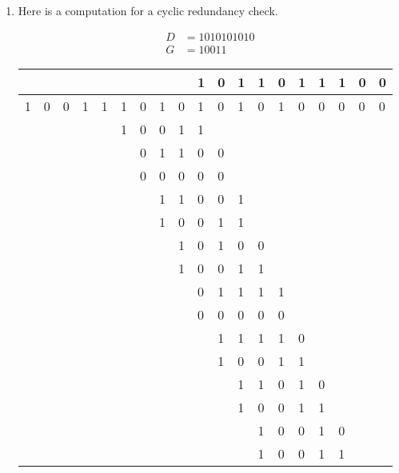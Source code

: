 \documentclass[twoside]{article}
\newenvironment{answer}
  {\vspace*{0.2cm} \rule{12cm}{0.04cm} \vspace*{0.2cm}}
  {\vspace*{0.2cm}}
\begin{document}
\begin{enumerate}
\begin{answer}
    \end{answer}

  \item Here is a computation for a cyclic redundancy check.

  \begin{align*}
    D & = 1010101010 \\
    G & = 10011
    \end{align*}

  \begin{tabular}{lllll|llllllllllllll}
      &   &   &   &   &   &   &   &   & 1 & 0 & 1 & 1 & 0 & 1 & 1 & 1 & 0 & 0    \\ \hline
    1 & 0 & 0 & 1 & 1 & 1 & 0 & 1 & 0 & 1 & 0 & 1 & 0 & 1 & 0 & 0 & 0 & 0 & 0  \\ 
      &   &   &   &   & 1 & 0 & 0 & 1 & 1 &   &   &   &   &   &   &   &   &    \\ \hline
      &   &   &   &   &   & 0 & 1 & 1 & 0 & 0 &   &   &   &   &   &   &   &    \\ 
      &   &   &   &   &   & 0 & 0 & 0 & 0 & 0 &   &   &   &   &   &   &   &    \\ \hline
      &   &   &   &   &   &   & 1 & 1 & 0 & 0 & 1 &   &   &   &   &   &   &    \\ 
      &   &   &   &   &   &   & 1 & 0 & 0 & 1 & 1 &   &   &   &   &   &   &    \\ \hline
      &   &   &   &   &   &   &   & 1 & 0 & 1 & 0 & 0 &   &   &   &   &   &    \\ 
      &   &   &   &   &   &   &   & 1 & 0 & 0 & 1 & 1 &   &   &   &   &   &    \\ \hline
      &   &   &   &   &   &   &   &   & 0 & 1 & 1 & 1 & 1 &   &   &   &   &    \\
      &   &   &   &   &   &   &   &   & 0 & 0 & 0 & 0 & 0 &   &   &   &   &    \\ \hline
      &   &   &   &   &   &   &   &   &   & 1 & 1 & 1 & 1 & 0 &   &   &   &    \\
      &   &   &   &   &   &   &   &   &   & 1 & 0 & 0 & 1 & 1 &   &   &   &    \\ \hline
      &   &   &   &   &   &   &   &   &   &   & 1 & 1 & 0 & 1 & 0 &   &   &    \\
      &   &   &   &   &   &   &   &   &   &   & 1 & 0 & 0 & 1 & 1 &   &   &    \\ \hline
      &   &   &   &   &   &   &   &   &   &   &   & 1 & 0 & 0 & 1 & 0 &   &    \\
      &   &   &   &   &   &   &   &   &   &   &   & 1 & 0 & 0 & 1 & 1 &   &    \\ \hline   

\end{tabular}
\end{enumerate}
\end{document}

